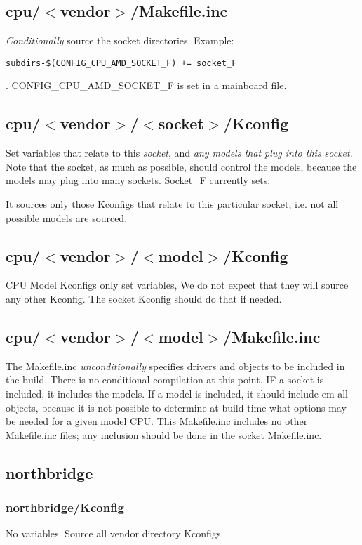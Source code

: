 \documentclass[10pt,letterpaper]{article}
\begin{document}
\subsection{cpu/$<$vendor$>$/Makefile.inc}
{\em Conditionally} source the socket directories.
Example:
\begin{verbatim}
subdirs-$(CONFIG_CPU_AMD_SOCKET_F) += socket_F
\end{verbatim}
.
CONFIG\_CPU\_AMD\_SOCKET\_F is set in a mainboard file.

\subsection{cpu/$<$vendor$>$/$<$socket$>$/Kconfig}
Set variables that relate to this {\em socket}, and {\em any models that plug into this socket}. Note that
the socket, as much as possible, should control the models, because the models may plug into many sockets.
Socket\_F currently sets:


It sources only those Kconfigs that relate to this particular socket, i.e. not all possible models are sourced.

\subsection{cpu/$<$vendor$>$/$<$model$>$/Kconfig}
CPU Model Kconfigs only set variables, We do not expect that they will source any other Kconfig. The socket Kconfig should do that
if needed.
\subsection{cpu/$<$vendor$>$/$<$model$>$/Makefile.inc}
The Makefile.inc {\em unconditionally} specifies drivers and objects to be included in the build. There is no conditional
compilation at this point. IF a socket is included, it includes the models. If a model is included, it should include {em all}
objects, because it is not possible to determine at build time what options may be needed for a given model CPU.
This Makefile.inc includes no other Makefile.inc files; any inclusion should be done in the socket Makefile.inc.

\subsection{northbridge}
\subsubsection{northbridge/Kconfig}
No variables. Source all vendor directory Kconfigs.
\end{document}
